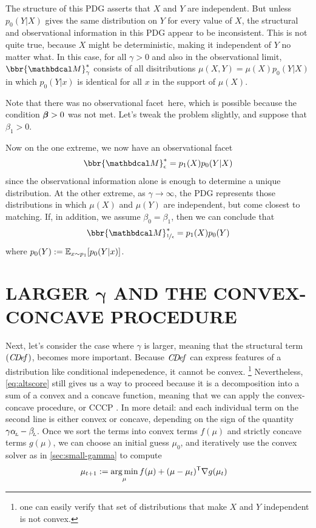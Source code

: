 \documentclass[twoside]{article}
\newcommand\obslimit{observational facet} %
\begin{document}
The structure of this PDG asserts that $X$ and $Y$ are independent.
But unless $p_0(Y|X)$ gives the same distribution on $Y$ for every value of $X$, the structural and observational information in this PDG appear to be inconsistent.
This is not quite true, because $X$ might be deterministic, making it independent of $Y$ no matter what. 
In this case, for all $\gamma > 0$ and also in the observational limit, 
$\bbr{\dg M}^*_\gamma$ consists of all disitributions $\mu(X,Y) = \mu(X)p_0(Y|X)$ in which
$p_0(Y|x)$ is identical for all $x$ in the support of $\mu(X)$.

Note that there was no \obslimit\ here, which is possible 
because the condition $\boldsymbol\beta > 0$ was not met.  Let's tweak the problem slightly, 
and suppose that $\beta_1 > 0$.

Now on the one extreme, we now have an \obslimit\
\[
    \bbr{\dg M}^*_{\epsilon} = p_1(X) p_0(Y|X)
\]
since the observational information alone is enough to determine a unique distribution.
At the other extreme, as $\gamma \to \infty$, the PDG represents those distributions 
in which $\mu(X)$ and $\mu(Y)$ are independent, but come closest to matching.
If, in addition, we assume $\beta_0 = \beta_1$, then we can conclude that
\[
    \bbr{\dg M}^*_{\nf1\epsilon} = p_1(X) p_0(Y) 
\]
where $p_0(Y) := \operatorname*{\mathbb{E}}_{x \sim p_1}[ p_0(Y|x) ]$.


\section{LARGER
    \texorpdfstring{$\boldsymbol\gamma$}{GAMMA} AND THE CONVEX-CONCAVE PROCEDURE}
    \label{sec:larger-gamma}

Next, let's consider the case where $\gamma$ is
larger, meaning that the structural term $(\mathit{C\mskip-3.5muD\mskip-2.5mue\mskip-1.5muf}_{})$,
becomes more important.
Because $\mathit{C\mskip-3.5muD\mskip-2.5mue\mskip-1.5muf}_{}$ can express features of a distribution like conditional indepenedence,
it cannot be convex.%
    \footnote{one can easily verify that set of distributions that make $X$ and $Y$ independent is not convex.}
Nevertheless, \eqref{eq:altscore} still gives us a way to proceed because it is a decomposition into a sum of a convex and a concave function, meaning that we can apply the convex-concave procedure, or CCCP \parencite{yuille2003concave}.
In more detail: and each individual term on the second line is either convex or concave, depending on the sign of the quantity $\gamma \alpha_{\!_{L}\!} - \beta_{\!_{L}\!}$.
Once we sort the terms into convex terms $f(\mu)$ and strictly concave terms $g(\mu)$, we can choose an initial guess $\mu_0$, and iteratively use the convex solver as in \cref{sec:small-gamma} to compute
%
\begin{align*}
    \mu_{t+1} &:= \operatorname*{arg\,min}_{\mu} f(\mu) + (\mu - \mu_{t})^{\sf T}
        \nabla g(\mu_t)
\end{align*}
\end{document}
